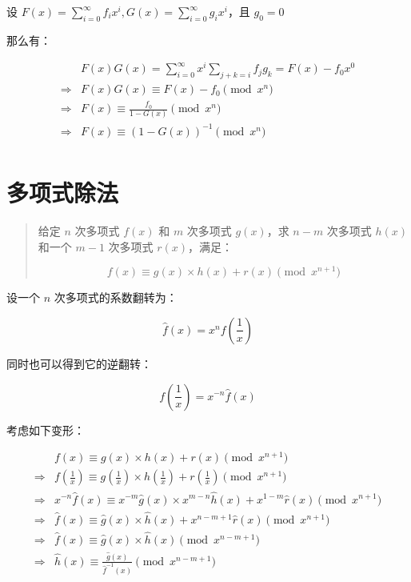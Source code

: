 \documentclass[UTF8]{article}
\begin{document}
设 $F(x)=\sum_{i=0}^{\infty}f_ix^i,G(x)=\sum_{i=0}^{\infty}g_ix^i$，且 $g_0=0$

那么有：

$$
\begin{aligned}
& F(x)G(x)=\sum_{i=0}^{\infty}x^i\sum_{j+k=i}f_jg_k=F(x)-f_0x^0 \\
\Rightarrow & F(x)G(x) \equiv F(x)-f_0 \pmod {x^n} \\
\Rightarrow & F(x) \equiv \frac{f_0}{1-G(x)} \pmod {x^n} \\
\Rightarrow & F(x) \equiv (1-G(x))^{-1} \pmod {x^n} \\
\end{aligned}
$$

\section{多项式除法}

\begin{quotation}
    给定 $n$ 次多项式 $f(x)$ 和 $m$ 次多项式 $g(x)$，求 $n-m$ 次多项式 $h(x)$ 和一个 $m-1$ 次多项式 $r(x)$，满足：

    $$
    f(x) \equiv g(x) \times h(x)+r(x) \pmod {x^{n+1}}
    $$
\end{quotation}

设一个 $n$ 次多项式的系数翻转为：

$$
\hat f(x)=x^nf(\frac{1}{x})
$$

同时也可以得到它的逆翻转：

$$
f(\frac{1}{x})=x^{-n}\hat f(x)
$$

考虑如下变形：

$$
\begin{aligned}
&f(x) \equiv g(x) \times h(x)+r(x) \pmod {x^{n+1}} \\
\Rightarrow 
& f(\frac{1}{x}) \equiv g(\frac{1}{x}) \times h(\frac{1}{x})+r(\frac{1}{x}) \pmod {x^{n+1}} \\
\Rightarrow 
& x^{-n}\hat f(x) \equiv x^{-m} \hat g(x) \times x^{m-n}\hat h(x)+x^{1-m}\hat r(x) \pmod {x^{n+1}} \\
\Rightarrow 
& \hat f(x) \equiv \hat g(x) \times \hat h(x)+x^{n-m+1}\hat r(x) \pmod {x^{n+1}} \\
\Rightarrow 
& \hat f(x) \equiv \hat g(x) \times \hat h(x) \pmod {x^{n-m+1}} \\
\Rightarrow 
& \hat h(x) \equiv \frac{\hat g(x)}{\hat f^{-1}(x)} \pmod {x^{n-m+1}} \\
\end{aligned}
$$
\end{document}
